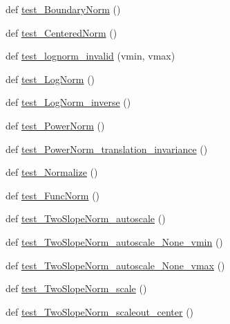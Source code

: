 \begin{DoxyCompactItemize}
\item 
def \hyperlink{namespacematplotlib_1_1tests_1_1test__colors_af88ce8fcebbfb4a680fd0ff003c1e4a6}{test\+\_\+\+Boundary\+Norm} ()
\item 
def \hyperlink{namespacematplotlib_1_1tests_1_1test__colors_a94b71d1380df91363721de4b88e72c0f}{test\+\_\+\+Centered\+Norm} ()
\item 
def \hyperlink{namespacematplotlib_1_1tests_1_1test__colors_aee4eb7a4a4e563df786d5b37d3876bd5}{test\+\_\+lognorm\+\_\+invalid} (vmin, vmax)
\item 
def \hyperlink{namespacematplotlib_1_1tests_1_1test__colors_ab29165b70158c82dba6b459f21ba7ac4}{test\+\_\+\+Log\+Norm} ()
\item 
def \hyperlink{namespacematplotlib_1_1tests_1_1test__colors_a9fdfa5868972a7bed342c619fe1d7133}{test\+\_\+\+Log\+Norm\+\_\+inverse} ()
\item 
def \hyperlink{namespacematplotlib_1_1tests_1_1test__colors_a8f3f0e1b17e0a0c83188a2c634f804bd}{test\+\_\+\+Power\+Norm} ()
\item 
def \hyperlink{namespacematplotlib_1_1tests_1_1test__colors_a4830b9361e3200b3455dde89c647fe8d}{test\+\_\+\+Power\+Norm\+\_\+translation\+\_\+invariance} ()
\item 
def \hyperlink{namespacematplotlib_1_1tests_1_1test__colors_adc4c18407dbed7aa8bb9738523c35855}{test\+\_\+\+Normalize} ()
\item 
def \hyperlink{namespacematplotlib_1_1tests_1_1test__colors_aa2116d6d95ed063cd77d65ca3262f9bc}{test\+\_\+\+Func\+Norm} ()
\item 
def \hyperlink{namespacematplotlib_1_1tests_1_1test__colors_ac82dabf9a1f378274468dc6521c6bb32}{test\+\_\+\+Two\+Slope\+Norm\+\_\+autoscale} ()
\item 
def \hyperlink{namespacematplotlib_1_1tests_1_1test__colors_a7f5bfc3760f03cfd37927a4eef84012c}{test\+\_\+\+Two\+Slope\+Norm\+\_\+autoscale\+\_\+\+None\+\_\+vmin} ()
\item 
def \hyperlink{namespacematplotlib_1_1tests_1_1test__colors_a6226ccab06a22e1b436c4b8b256a816b}{test\+\_\+\+Two\+Slope\+Norm\+\_\+autoscale\+\_\+\+None\+\_\+vmax} ()
\item 
def \hyperlink{namespacematplotlib_1_1tests_1_1test__colors_a2843b78f3e0758124b1732479e8a27d5}{test\+\_\+\+Two\+Slope\+Norm\+\_\+scale} ()
\item 
def \hyperlink{namespacematplotlib_1_1tests_1_1test__colors_a1b12c397566281c33a9825fe1f49a0a4}{test\+\_\+\+Two\+Slope\+Norm\+\_\+scaleout\+\_\+center} ()
\item 

\end{DoxyCompactItemize}

